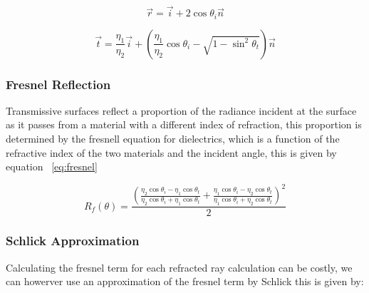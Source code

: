 \begin{equation}
\vec{r} = \vec{i} + 2 \cos{\theta_i} \vec{n}
\label{eq:refl}
\end{equation}

\begin{equation}
\vec{t} = \frac{\eta_1}{\eta_2} \vec{i} + \left(\frac{\eta_1}{\eta_2} \cos{\theta_i} - \sqrt{1 - \sin^2\theta_t}\right) \vec{n}
\label{eq:refr}
\end{equation}

\begin{figure}
\centering
{}
\end{figure}

\subsubsection{Fresnel Reflection}
Transmissive surfaces reflect a proportion of the radiance incident at the surface as it passes from a material with a different
index of refraction, this proportion is determined by the fresnell equation for dielectrics, which is a function of the refractive
index of the two materials and the incident angle, this is given by equation ~\ref{eq:fresnel}

\begin{equation}
R_f(\theta)
=
\frac{
	\left(
	\frac
	{
	\eta_2 \cos{\theta_i} - \eta_1 \cos{\theta_t}
	}
	{
	\eta_2 \cos{\theta_i} + \eta_1 \cos{\theta_t}
	}
	+
	\frac
	{
	\eta_1 \cos{\theta_i} - \eta_2 \cos{\theta_t}
	}
	{
	\eta_1 \cos{\theta_i} + \eta_2 \cos{\theta_t}
	}
\right)^2
}{2}
\label{eq:fresnel}
\end{equation}

\subsubsection{Schlick Approximation}
Calculating the fresnel term for each refracted ray calculation can be costly, we can howerver use an approximation of the fresnel term
by Schlick \cite{sc94} this is given by:

